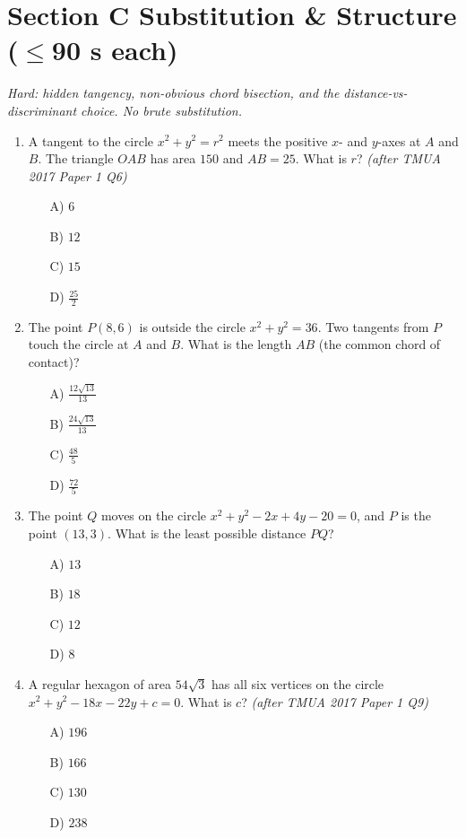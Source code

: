 \documentclass[11pt,a4paper]{article}
\begin{document}
\section*{Section C \quad Substitution \& Structure \hfill{\normalfont\small($\leq$90 s each)}}

\noindent\textit{Hard: hidden tangency, non-obvious chord bisection, and the distance-vs-discriminant choice. No brute substitution.}

\begin{enumerate}

\item A tangent to the circle $x^2+y^2=r^2$ meets the positive $x$- and $y$-axes at $A$ and $B$. The triangle $OAB$ has area $150$ and $AB=25$. What is $r$? \textit{\small(after TMUA 2017 Paper 1 Q6)}
\begin{itemize}
\item[A)] $6$
\item[B)] $12$
\item[C)] $15$
\item[D)] $\tfrac{25}{2}$
\end{itemize}

\item The point $P(8,6)$ is outside the circle $x^2+y^2=36$. Two tangents from $P$ touch the circle at $A$ and $B$. What is the length $AB$ (the common chord of contact)?
\begin{itemize}
\item[A)] $\tfrac{12\sqrt{13}}{13}$
\item[B)] $\tfrac{24\sqrt{13}}{13}$
\item[C)] $\tfrac{48}{5}$
\item[D)] $\tfrac{72}{5}$
\end{itemize}

\item The point $Q$ moves on the circle $x^2+y^2-2x+4y-20=0$, and $P$ is the point $(13,3)$. What is the least possible distance $PQ$?
\begin{itemize}
\item[A)] $13$
\item[B)] $18$
\item[C)] $12$
\item[D)] $8$
\end{itemize}

\item A regular hexagon of area $54\sqrt3$ has all six vertices on the circle $x^2+y^2-18x-22y+c=0$. What is $c$? \textit{\small(after TMUA 2017 Paper 1 Q9)}
\begin{itemize}
\item[A)] $196$
\item[B)] $166$
\item[C)] $130$
\item[D)] $238$
\end{itemize}


\end{enumerate}
\end{document}
